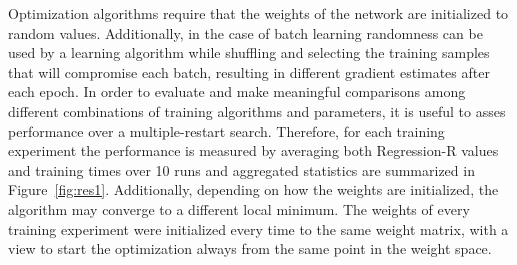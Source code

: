 \documentclass[conference,compsoc]{IEEEtran}
\begin{document}
Optimization algorithms require that the weights of the network are initialized to random values. Additionally, in the case of batch learning randomness can be used by a learning algorithm while shuffling and selecting the training samples that will compromise each batch, resulting in different gradient estimates after each epoch. In order to evaluate and make meaningful comparisons among different combinations of training algorithms and parameters, it is useful to asses performance over a multiple-restart search. Therefore, for each training experiment the performance is measured by averaging both Regression-R values and training times over 10 runs and aggregated statistics are summarized in Figure~\ref{fig:res1}. Additionally, depending on how the weights are initialized, the algorithm may converge to a different local minimum. The weights of every training experiment were initialized every time to the same weight matrix, with a view to start the optimization always from the same point in the weight space. 
  
\end{document}
